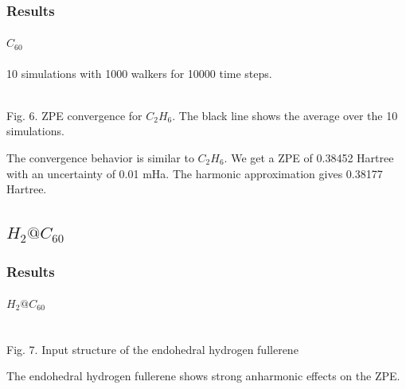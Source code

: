 \documentclass[16pt]{beamer}
\begin{document}
\begin{frame}
\frametitle{Results}
\framesubtitle{$C_{60}$}
10 simulations with 1000 walkers for 10000 time steps.
\begin{center}
\\
Fig. 6. ZPE convergence for $C_2 H_6$. The black line shows the average over the 10 simulations.
\end{center}
The convergence behavior is similar to $C_2H_6$. We get a ZPE of 0.38452 Hartree with an uncertainty of 0.01 mHa. The harmonic approximation gives 0.38177 Hartree.
\end{frame}


\subsection{$H_2@C_{60}$}

\begin{frame}
\frametitle{Results}
\framesubtitle{$H_2@C_{60}$}
\begin{center}
\\
Fig. 7. Input structure of the endohedral hydrogen fullerene
\end{center}
The endohedral hydrogen fullerene shows strong anharmonic effects on the ZPE.\\
\end{frame}
\end{document}
